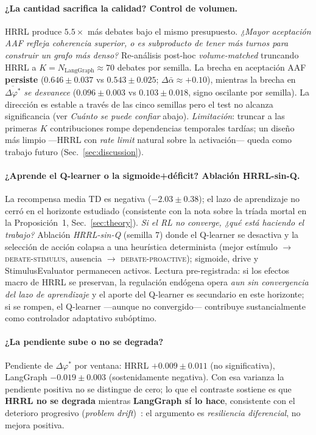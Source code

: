 \documentclass{llncs}
\begin{document}
\paragraph{¿La cantidad sacrifica la calidad? Control de volumen.}
HRRL produce $5.5\times$ m\'as debates bajo el mismo presupuesto.
\emph{¿Mayor aceptaci\'on AAF refleja coherencia superior, o es
subproducto de tener m\'as turnos para construir un grafo m\'as
denso?} Re-an\'alisis post-hoc \emph{volume-matched} truncando HRRL a
$K{=}N_{\text{LangGraph}}{\approx}70$ debates por semilla. La brecha
en aceptaci\'on AAF \textbf{persiste} ($0.646{\pm}0.037$ vs
$0.543{\pm}0.025$; $\Delta\bar{\alpha}{\approx}{+}0.10$), mientras la
brecha en $\overline{\Delta\varphi^*}$ \emph{se desvanece}
($0.096{\pm}0.003$ vs $0.103{\pm}0.018$, signo oscilante por semilla).
La direcci\'on es estable a trav\'es de las cinco semillas pero el
test no alcanza significancia (ver \emph{Cu\'anto se puede confiar}
abajo). \emph{Limitaci\'on}: truncar a
las primeras $K$ contribuciones rompe dependencias temporales
tard\'ias; un dise\~no m\'as limpio ---HRRL con \emph{rate limit}
natural sobre la activaci\'on--- queda como trabajo futuro
(Sec.~\ref{sec:discussion}).

\paragraph{¿Aprende el Q-learner o la sigmoide+d\'eficit? Ablaci\'on
HRRL-sin-Q.}\label{par:ablation}
La recompensa media TD es negativa ($-2.03 \pm 0.38$); el lazo de
aprendizaje no cerr\'o en el horizonte estudiado (consistente con la
nota sobre la tr\'iada mortal en la Proposici\'on~1,
Sec.~\ref{sec:theory}). \emph{Si el RL no converge, ¿qu\'e est\'a
haciendo el trabajo?} Ablaci\'on \emph{HRRL-sin-Q} (semilla 7) donde
el Q-learner se desactiva y la selecci\'on de acci\'on colapsa a una
heur\'istica determinista (mejor est\'imulo $\to$
\textsc{debate-stimulus}, ausencia $\to$ \textsc{debate-proactive});
sigmoide, drive y StimulusEvaluator permanecen activos. Lectura
pre-registrada: si los efectos macro de HRRL se preservan, la
regulaci\'on end\'ogena opera \emph{aun sin convergencia del lazo de
aprendizaje} y el aporte del Q-learner es secundario en este
horizonte; si se rompen, el Q-learner ---aunque no convergido---
contribuye sustancialmente como controlador adaptativo sub\'optimo.

\paragraph{¿La pendiente sube o no se degrada?}
Pendiente de $\Delta\varphi^*$ por ventana: HRRL $+0.009 \pm 0.011$
(no significativa), LangGraph $-0.019 \pm 0.003$ (sostenidamente
negativa). Con esa varianza la pendiente positiva no se distingue de
cero; lo que el contraste sostiene es que \textbf{HRRL no se degrada}
mientras \textbf{LangGraph s\'i lo hace}, consistente con el
deterioro progresivo (\emph{problem
drift})~\parencite{becker2025problemdrift}: el argumento es
\emph{resiliencia diferencial}, no mejora positiva.
\end{document}
